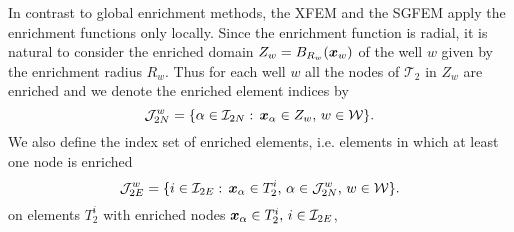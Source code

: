 In contrast to global enrichment methods, the XFEM and the SGFEM apply the enrichment functions only locally. 
Since the enrichment function is radial, it is natural to consider the enriched domain $Z_w = B_{R_w}(\mathbf{\boldsymbol{x}}_w)$
of the well $w$ given by the enrichment radius $R_w$. Thus for each well $w$ all the nodes of $\mathcal{T}_2$
in $Z_w$ are enriched and we denote the enriched element indices by
\begin{equation} \label{eqn:prim_enriched_nodes}
    \mathcal{J}^w_{2N} = \{\alpha\in\mathcal{I}_{2N}:\, \mathbf{\boldsymbol{x}}_\alpha\in Z_w, \, w\in\mathcal{W}\}.
\end{equation}
We also define the index set of enriched elements, i.e. elements in which at least one node is enriched
\begin{equation} \label{eqn:prim_enriched_elements}
    \mathcal{J}^w_{2E} = \{i\in\mathcal{I}_{2E}:\, \mathbf{\boldsymbol{x}}_\alpha\in T^i_2,\, \alpha\in\mathcal{J}^w_{2N},\, w\in\mathcal{W} \}.
\end{equation}
on elements $T_2^i$ with enriched nodes $\mathbf{\boldsymbol{x}}_\alpha\in{T_2^i},\, i\in\mathcal{I}_{2E}$,

